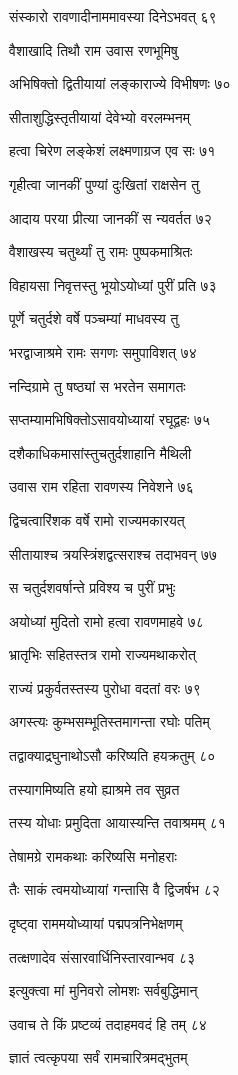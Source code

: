 संस्कारो रावणादीनाममावस्या दिनेऽभवत् ६९

वैशाखादि तिथौ राम उवास रणभूमिषु

अभिषिक्तो द्वितीयायां लङ्काराज्ये विभीषणः ७०

सीताशुद्धिस्तृतीयायां देवेभ्यो वरलम्भनम्

हत्वा चिरेण लङ्केशं लक्ष्मणाग्रज एव सः ७१

गृहीत्वा जानकीं पुण्यां दुःखितां राक्षसेन तु

आदाय परया प्रीत्या जानकीं स न्यवर्तत ७२

वैशाखस्य चतुर्थ्यां तु रामः पुष्पकमाश्रितः

विहायसा निवृत्तस्तु भूयोऽयोध्यां पुरीं प्रति ७३

पूर्णे चतुर्दशे वर्षे पञ्चम्यां माधवस्य तु

भरद्वाजाश्रमे रामः सगणः समुपाविशत् ७४

नन्दिग्रामे तु षष्ठ्यां स भरतेन समागतः

सप्तम्यामभिषिक्तोऽसावयोध्यायां रघूद्वहः ७५

दशैकाधिकमासांस्तुचतुर्दशाहानि मैथिली

उवास राम रहिता रावणस्य निवेशने ७६

द्विचत्वारिंशक वर्षे रामो राज्यमकारयत्

सीतायाश्च त्रयस्त्रिंशद्वत्सराश्च तदाभवन् ७७

स चतुर्दशवर्षान्ते प्रविश्य च पुरीं प्रभुः

अयोध्यां मुदितो रामो हत्वा रावणमाहवे ७८

भ्रातृभिः सहितस्तत्र रामो राज्यमथाकरोत्

राज्यं प्रकुर्वतस्तस्य पुरोधा वदतां वरः ७९

अगस्त्यः कुम्भसम्भूतिस्तमागन्ता रघोः पतिम्

तद्वाक्याद्रघुनाथोऽसौ करिष्यति हयक्रतुम् ८०

तस्यागमिष्यति हयो ह्याश्रमे तव सुव्रत

तस्य योधाः प्रमुदिता आयास्यन्ति तवाश्रमम् ८१

तेषामग्रे रामकथाः करिष्यसि मनोहराः

तैः साकं त्वमयोध्यायां गन्तासि वै द्विजर्षभ ८२

दृष्ट्वा राममयोध्यायां पद्मपत्रनिभेक्षणम्

तत्क्षणादेव संसारवार्धिनिस्तारवान्भव ८३

इत्युक्त्वा मां मुनिवरो लोमशः सर्वबुद्धिमान्

उवाच ते किं प्रष्टव्यं तदाहमवदं हि तम् ८४

ज्ञातं त्वत्कृपया सर्वं रामचारित्रमद्भुतम्

